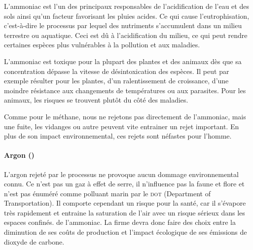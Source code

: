 \documentclass[a4paper, oneside, 12pt]{article}
\begin{document}
L’ammoniac est l’un des principaux responsables de l’acidification de l’eau 
et des sols ainsi qu’un facteur favorisant les pluies acides. 
Ce qui cause l’eutrophisation, c’est-à-dire le processus par lequel des nutriments 
s’accumulent dans un milieu terrestre ou aquatique. 
Ceci est dû à l’acidification du milieu, 
ce qui peut rendre certaines espèces plus vulnérables à la pollution et aux maladies. 
	
L’ammoniac est toxique pour la plupart des plantes 
et des animaux dès que sa concentration dépasse la vitesse de désintoxication des espèces. 
Il peut par exemple résulter pour les plantes, d’un ralentissement de croissance, 
d’une moindre résistance aux changements de températures ou aux parasites. 
Pour les animaux, les risques se trouvent plutôt du côté des maladies. 

Comme pour le méthane, nous ne rejetons pas directement de l’ammoniac, mais une fuite,
les vidanges ou autre peuvent vite entrainer un rejet important.
En plus de son impact environnemental, ces rejets sont néfastes pour l’homme.

\paragraph{Argon ()}

L’argon rejeté par le processus ne provoque aucun dommage environnemental connu. 
Ce n’est pas un gaz à effet de serre, 
il n’influence pas la faune et flore et n’est pas énuméré comme polluant marin 
par le \textsc{dot} (Department of Transportation). 
Il comporte cependant un risque pour la santé, car il s’évapore très rapidement 
et entraine la saturation de l’air avec un risque sérieux dans les espaces confinés.
 de l’ammoniac.
La firme devra donc faire des choix entre la diminution de ses coûts de production 
et l’impact écologique de ses émissions de dioxyde de carbone.
\end{document}
